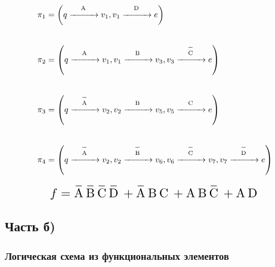 \documentclass[a4paper, 14pt]{extarticle}
\begin{document}

\begin{align*}
  & \pi_1 = \left(q   \overset{\NOV{A}}{\xrightarrow{\hspace*{1cm}}} v_1, 
                v_1 \overset{\NOV{D}}{\xrightarrow{\hspace*{1cm}}}  e \right) \\[2em]
  & \pi_2 = \left(q   \overset{\NOV{A}}{\xrightarrow{\hspace*{1cm}}} v_1, 
                v_1 \overset{\NOV{B}}{\xrightarrow{\hspace*{1cm}}}  v_3,
                v_3 \overset{\OV{C}}{\xrightarrow{\hspace*{1cm}}}  e \right) \\[2em]
  & \pi_3 = \left(q   \overset{\OV{A}}{\xrightarrow{\hspace*{1cm}}} v_2, 
                v_2 \overset{\NOV{B}}{\xrightarrow{\hspace*{1cm}}}  v_5,
                v_5 \overset{\NOV{C}}{\xrightarrow{\hspace*{1cm}}}  e \right) \\[2em]
  & \pi_4 = \left(q   \overset{\OV{A}}{\xrightarrow{\hspace*{1cm}}} v_2, 
                v_2 \overset{\OV{B}}{\xrightarrow{\hspace*{1cm}}}  v_6,
                v_6 \overset{\OV{C}}{\xrightarrow{\hspace*{1cm}}}  v_7,
                v_7 \overset{\OV{D}}{\xrightarrow{\hspace*{1cm}}}  e \right)
\end{align*}

\vfill

\begin{equation*}
  \scalebox{1.5}{$f = \OV{A}\OV{B}\OV{C}\OV{D} + \OV{A}\NOV{B}\NOV{C} + \NOV{A}\NOV{B}\OV{C} + \NOV{A}\NOV{D}$}
\end{equation*}

\vfill

\newpage

\subsection{Часть б)}

\subsubsection{Логическая схема из функциональных элементов}
\end{document}
